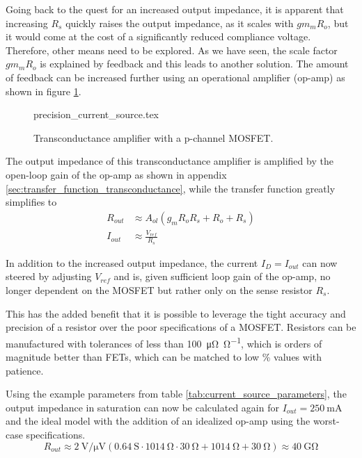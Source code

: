 Going back to the quest for an increased output impedance, it is apparent that increasing $R_s$ quickly raises the output impedance, as it scales with $gm_m R_o$, but it would come at the cost of a significantly reduced compliance voltage. Therefore, other means need to be explored. As we have seen, the scale factor $gm_m R_o$ is explained by feedback and this leads to another solution. The amount of feedback can be increased further using an operational amplifier (op-amp) as shown in figure \ref{fig:precision_current_source}.
\begin{figure}[ht]
    \centering
    {precision_current_source.tex}
    \caption{Transconductance amplifier with a p-channel MOSFET.}
    \label{fig:precision_current_source}
\end{figure}

The output impedance of this transconductance amplifier is amplified by the open-loop gain of the op-amp as shown in appendix \ref{sec:transfer_function_transconductance}, while the transfer function greatly simplifies to
\begin{align}
    R_{out} &\approx A_{ol} \left(g_m R_o R_s + R_o + R_s \right) \nonumber\\
    I_{out} &\approx \frac{V_{ref}}{R_s} \label{eqn:current_source_transfer_function}
\end{align}

In addition to the increased output impedance, the current $I_D = I_{out}$ can now steered by adjusting $V_{ref}$ and is, given sufficient loop gain of the op-amp, no longer dependent on the MOSFET but rather only on the sense resistor $R_s$.

This has the added benefit that it is possible to leverage the tight accuracy and precision of a resistor over the poor specifications of a MOSFET. Resistors can be manufactured with tolerances of less than \qty{100}{\micro \ohm \per \ohm}, which is orders of magnitude better than FETs, which can be matched to low \unit{\percent} values with patience.

Using the example parameters from table \ref{tab:current_source_parameters}, the output impedance in saturation can now be calculated again for $I_{out}=\qty{250}{\mA}$ and the ideal  model with the addition of an idealized  op-amp using the worst-case specifications.
\begin{equation}
    R_{out} \approx \qty[per-mode=power]{2}{\volt \per \uV} \left(\qty{0.64}{\siemens}\cdot \qty{1014}{\ohm} \cdot \qty{30}{\ohm} + \qty{1014}{\ohm} + \qty{30}{\ohm} \right) \approx \qty{40}{\giga\ohm} \label{eqn:current_source_output_impedance}
\end{equation}


